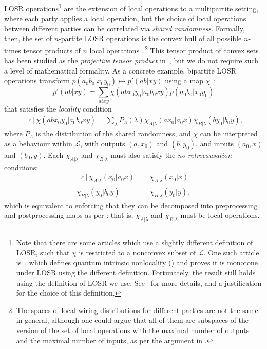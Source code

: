 \documentclass[10pt, a4paper]{article}
\numberwithin{equation}{section} %
\theoremstyle{definition}
\theoremstyle{plain}
\newcommand{\?}{\mathrel{?}} %
\newcommand{\Ls}{\mathcal{L}}
\begin{document}
              LOSR operations\footnote{Note that there are some articles which use a slightly different definition of LOSR, such that \(\chi\) is restricted to a nonconvex subset of \(\Ls\). One such article is~\cite{DIQKD_Limits}, which defines quantum intrinsic nonlocality () and proves it is monotone under LOSR using the different definition. Fortunately, the result still holds using the definition of LOSR we use. See~\cite[Sec A.2]{BellResourceTheory} for more details, and a justification for the choice of this definition.} are the extension of local operations to a multipartite setting, where each party applies a local operation, but the choice of local operations between different parties can be correlated via \emph{shared randomness}. Formally, then, the set of \(n\)-partite LOSR operations is the convex hull of all possible \(n\)-times tensor products of \(n\) local operations~\cite{LocalTransformations}.\footnote{The spaces of local wiring distributions for different parties are not the same in general, although one could argue that all of them are subspaces of the version of the set of local operations with the maximal number of outputs and the maximal number of inputs, as per the argument in .} This tensor product of convex sets has been studied as the \emph{projective tensor product} in~\cite{AliceBobBanach}, but we do not require such a level of mathematical formality. As a concrete example, bipartite LOSR operations transform \(p(a_0 b_0|x_0 y_0) \mapsto p'(ab|xy)\) using a map \(\chi\)~\cite{BellResourceTheory}:
              \begin{equation}
                p'(ab|xy) = \sum_{abxy} \chi(abx_0y_0|a_0b_0xy) p(a_0b_0|x_0y_0)
              \end{equation}
              that satisfies the \emph{locality} condition
              \begin{equation}
                \begin{aligned}[c]
                  \chi(abx_0y_0|a_0b_0xy) = \sum_{\lambda} P_{\Lambda}(\lambda) \chi_{A|\lambda}(ax_0|a_0x) \chi_{B|\lambda}(by_0|b_0y),
                \end{aligned}
              \end{equation}
              where \(P_{\Lambda}\) is the distribution of the shared randomness, and \(\chi\) can be interpreted as a behaviour within \(\Ls\), with outputs \((a, x_0)\) and \((b, y_0)\), and inputs \((a_0, x)\) and \((b_0, y)\). Each \(\chi_{A|\lambda}\) and \(\chi_{B|\lambda}\) must also satisfy the \emph{no-retrocausation} conditions:
              \begin{equation}
                \begin{aligned}[c]
                  \chi_{A|\lambda}(x_0|a_0x) &= \chi_{A|\lambda}(x_0|x) \\
                  \chi_{B|\lambda}(y_0|b_0y) &= \chi_{B|\lambda}(y_0|y),
                \end{aligned}
              \end{equation}
              which is equivalent to enforcing that they can be decomposed into preprocessing and postprocessing maps as per : that is, \(\chi_{A|\lambda}\) and \(\chi_{B|\lambda}\) must be local operations.
\end{document}
